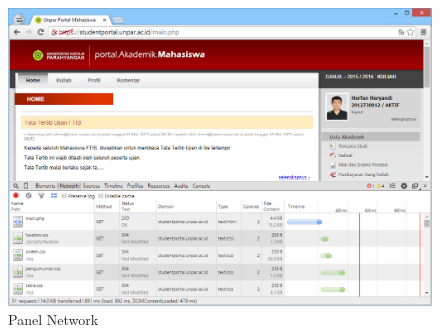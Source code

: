 \begin{figure}[H]
	\centering
	\includegraphics[scale=0.5]{Gambar/network-panel}
	\caption{Panel Network} 
	\label{fig:2_network_panel}
\end{figure}


